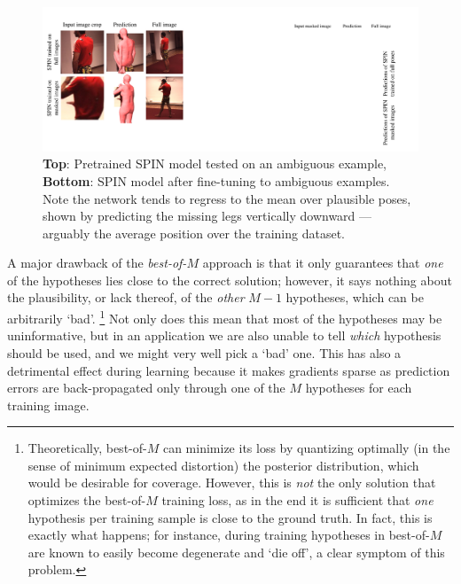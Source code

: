 \begin{figure}
  \vspace{-0.3cm}
  \begin{center}
    \includegraphics[width=\linewidth]{failures/failure_summary_v2} %
  \end{center}
    \vspace{-0.3cm}
    \caption{\textbf{Top}: Pretrained SPIN model tested on an ambiguous example, \textbf{Bottom}: SPIN model after fine-tuning to ambiguous examples. Note the network tends to regress to the mean over plausible poses, shown by predicting the missing legs vertically downward --- arguably the average position over the training dataset.}\label{fig:issues}
\end{figure}


A major drawback of the \emph{best-of-$M$} approach is that it only guarantees that \emph{one} of the hypotheses lies close to the correct solution; however, it says nothing about the plausibility, or lack thereof, of the \emph{other} $M-1$ hypotheses, which can be arbitrarily `bad'.%
%
\footnote{
Theoretically, best-of-$M$ can minimize its loss by quantizing optimally (in the sense of minimum expected distortion) the posterior distribution, which would be desirable for coverage.
However, this is \emph{not} the only solution that optimizes the best-of-$M$ training loss, as in the end it is sufficient that \emph{one} hypothesis per training sample is close to the ground truth.
In fact, this is exactly what happens; for instance, during training hypotheses in best-of-$M$ are known to easily become degenerate and `die off', a clear symptom of this problem.
}
%
Not only does this mean that most of the hypotheses may be uninformative, but in an application we are also unable to tell \emph{which} hypothesis should be used, and we might very well pick a `bad'
one.
This has also a detrimental effect during learning because it  makes gradients sparse as prediction errors are back-propagated only through one of the $M$ hypotheses for each training image.

